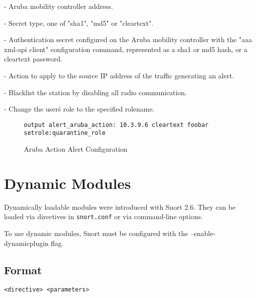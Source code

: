 \documentclass[english]{report}
\newenvironment{note}{
\samepage
    \vspace{10pt}{\textsf{
        {\hspace{7pt}\Huge{$\triangle$\hspace{-12.5pt}{\Large{$^!$}}}}\hspace{5pt}
        {\Large{NOTE}}
    }
    }
   \begin{center}
    \par\vspace{-17pt}

    \begin{lrbox}{\savepar}
    \begin{minipage}[r]{6in}
}
{
    \end{minipage}
    \end{lrbox}
    \fbox{
        \usebox{
            \savepar
	}
    }
    \par\vskip10pt
    \end{center}
}
\begin{document}
\begin{description}{}
\item [\texttt{controller address}] - Aruba mobility controller address.
\item [\texttt{secrettype}] - Secret type, one of "sha1", "md5" or "cleartext".
\item [\texttt{secret}] - Authentication secret configured on the Aruba mobility controller with the "aaa xml-api client" configuration command, represented as a sha1 or md5 hash, or a cleartext password.
\item [\texttt{action}] - Action to apply to the source IP address of the traffic generating an alert.

  \begin{description}{}
      \item [\texttt{blacklist}]- Blacklist the station by disabling all radio communication.
      \item [\texttt{setrole:rolename}]- Change the user\'s role to the specified rolename.
  \end{description}
\end{description}

\begin{figure}[!hbpt]
\begin{verbatim}
output alert_aruba_action: 10.3.9.6 cleartext foobar setrole:quarantine_role
\end{verbatim}

\caption{\label{aruba_action configuration}Aruba Action Alert Configuration}
\end{figure}

\section{Dynamic Modules}

Dynamically loadable modules were introduced with Snort 2.6.  They can
be loaded via directives in \texttt{snort.conf} or via command-line options.

\begin{note}
To use dynamic modules, Snort must be configured with the
--enable-dynamicplugin flag.
\end{note}

\subsection{Format}

\begin{center}
\begin{verbatim}
<directive> <parameters>
\end{verbatim}
\end{center}
\end{document}
